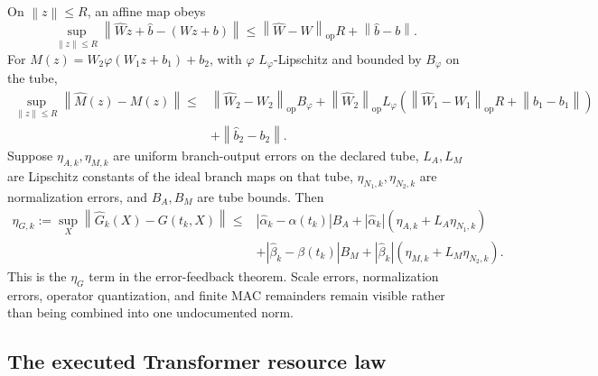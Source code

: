 \documentclass[twoside,11pt]{article}
\newcommand{\norm}[1]{\left\lVert #1\right\rVert}
\newcommand{\abs}[1]{\left\lvert #1\right\rvert}
\begin{document}
On $\norm z\le R$, an affine map obeys
\begin{equation}
 \sup_{\norm z\le R}\norm{\widehat Wz+\widehat b-(Wz+b)}
 \le\norm{\widehat W-W}_{\mathrm{op}}R+\norm{\widehat b-b}.
 \label{eq:affine-error-main}
\end{equation}
For $M(z)=W_2\varphi(W_1z+b_1)+b_2$, with $\varphi$ $L_\varphi$-Lipschitz and bounded by $B_\varphi$ on the tube,
\begin{align}
 \sup_{\norm z\le R}\norm{\widehat M(z)-M(z)}
 \le{}&\norm{\widehat W_2-W_2}_{\mathrm{op}}B_\varphi
 +\norm{\widehat W_2}_{\mathrm{op}}L_\varphi
  \left(\norm{\widehat W_1-W_1}_{\mathrm{op}}R
       +\norm{\widehat b_1-b_1}\right)\\
 &+\norm{\widehat b_2-b_2}.
 \label{eq:mlp-error-main}
\end{align}
Suppose $\eta_{A,k},\eta_{M,k}$ are uniform branch-output errors on the declared tube, $L_A,L_M$ are Lipschitz constants of the ideal branch maps on that tube, $\eta_{N_1,k},\eta_{N_2,k}$ are normalization errors, and $B_A,B_M$ are tube bounds.  Then
\begin{align}
 \eta_{G,k}:=
 \sup_X\norm{\widehat G_k(X)-G(t_k,X)}
 \le{}&\abs{\widehat\alpha_k-\alpha(t_k)}B_A
 +\abs{\widehat\alpha_k}(\eta_{A,k}+L_A\eta_{N_1,k})\\
 &+\abs{\widehat\beta_k-\beta(t_k)}B_M
 +\abs{\widehat\beta_k}(\eta_{M,k}+L_M\eta_{N_2,k}).
 \label{eq:transformer-field-error-main}
\end{align}
This is the $\eta_G$ term in the error-feedback theorem.  Scale errors, normalization errors, operator quantization, and finite MAC remainders remain visible rather than being combined into one undocumented norm.

\subsection{The executed Transformer resource law}
\label{sec:executed-transformer-law-main}
\end{document}
